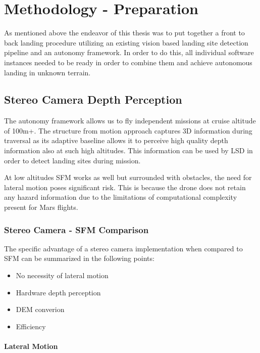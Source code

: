 \chapter{Methodology - Preparation}
\label{sec:methodology_preparation}

As mentioned above the endeavor of this thesis was to put together a front to back landing procedure utilizing an existing vision based landing site detection pipeline and an autonomy framework. In order to do this, all individual software instances needed to be ready in order to combine them and achieve autonomous landing in unknown terrain.

\section{Stereo Camera Depth Perception} \label{sec:StereoDepth}

The autonomy framework\citep{Autonomy} allows us to fly independent missions at cruise altitude of 100m+. The structure from motion approach captures 3D information during traversal as its adaptive baseline allows it to perceive high quality depth information also at such high altitudes. This information can be used by LSD in order to detect landing sites during mission. 

At low altitudes SFM works as well but surrounded with obstacles, the need for lateral motion poses significant risk. This is because the drone does not retain any hazard information due to the limitations of computational complexity present for Mars flights. 

\subsection{Stereo Camera - SFM Comparison}

The specific advantage of a stereo camera implementation when compared to SFM can be summarized in the following points:

\begin{itemize}
    \item No necessity of lateral motion
    \item Hardware depth perception
    \item DEM converion
    \item Efficiency
\end{itemize}

\subsubsection{Lateral Motion}

